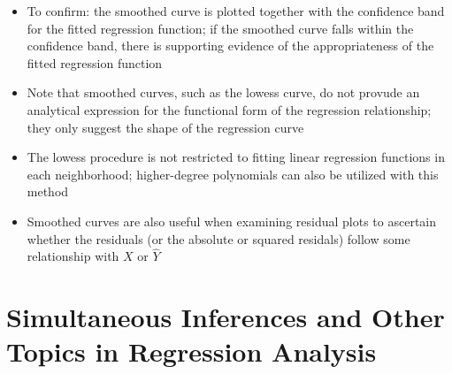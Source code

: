 \begin{itemize}
\item To confirm: the smoothed curve is plotted together with the confidence band for the fitted regression function; if the smoothed curve falls within the confidence band, there is supporting evidence of the appropriateness of the fitted regression function
\item Note that smoothed curves, such as the lowess curve, do not provude an analytical expression for the functional form of the regression relationship; they only suggest the shape of the regression curve
\item The lowess procedure is not restricted to fitting linear regression functions in each neighborhood; higher-degree polynomials can also be utilized with this method 
\item Smoothed curves are also useful when examining residual plots to ascertain whether the residuals (or the absolute or squared residals) follow some relationship with $X$ or $\hat{Y}$
\end{itemize} 


\section{Simultaneous Inferences and Other Topics in Regression Analysis}
